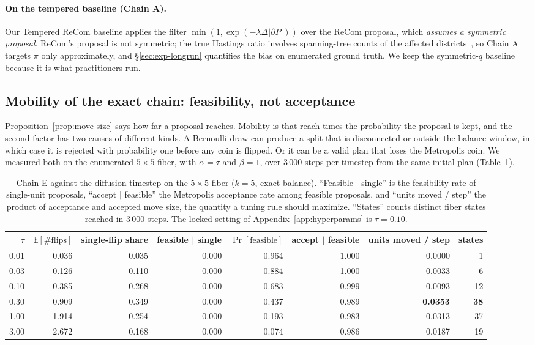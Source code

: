\documentclass[11pt]{article}
\newcommand{\E}{\mathbb{E}}
\begin{document}
\paragraph{On the tempered baseline (Chain A).} Our Tempered ReCom
baseline applies the filter $\min(1, \exp(-\lambda \Delta|\partial P|))$
over the ReCom proposal, which \emph{assumes a symmetric proposal}.
ReCom's proposal is not symmetric; the true Hastings ratio involves
spanning-tree counts of the affected
districts~\cite{autry2023metropolized,cannon2022spanning}, so Chain A
targets $\pi$ only approximately, and \S\ref{sec:exp-longrun}
quantifies the bias on enumerated ground truth. We keep the
symmetric-$q$ baseline because it is what practitioners run.

\subsection{Mobility of the exact chain: feasibility, not acceptance}\label{sec:mobility}

Proposition~\ref{prop:move-size} says how far a proposal reaches.
Mobility is that reach times the probability the proposal is kept,
and the second factor has two causes of different kinds. A Bernoulli
draw can produce a split that is disconnected or outside the balance
window, in which case it is rejected with probability one before any
coin is flipped. Or it can be a valid plan that loses the Metropolis
coin. We measured both on the enumerated $5 \times 5$ fiber, with
$\alpha = \tau$ and $\beta = 1$, over 3\,000 steps per timestep from
the same initial plan (Table~\ref{tab:mobility}).

\begin{table}[htbp]
\centering
\small
\begin{tabular}{rrrrrrrr}
\toprule
$\tau$ & $\E[\#\mathrm{flips}]$ & single-flip share & feasible $\mid$ single
  & $\Pr[\text{feasible}]$ & accept $\mid$ feasible & units moved / step & states \\
\midrule
0.01 & 0.036 & 0.035 & 0.000 & 0.964 & 1.000 & 0.0000 & 1 \\
0.03 & 0.126 & 0.110 & 0.000 & 0.884 & 1.000 & 0.0033 & 6 \\
0.10 & 0.385 & 0.268 & 0.000 & 0.683 & 0.999 & 0.0093 & 12 \\
0.30 & 0.909 & 0.349 & 0.000 & 0.437 & 0.989 & \textbf{0.0353} & \textbf{38} \\
1.00 & 1.914 & 0.254 & 0.000 & 0.193 & 0.983 & 0.0313 & 37 \\
3.00 & 2.672 & 0.168 & 0.000 & 0.074 & 0.986 & 0.0187 & 19 \\
\bottomrule
\end{tabular}
\caption{Chain E against the diffusion timestep on the $5 \times 5$
  fiber ($k = 5$, exact balance). ``Feasible $\mid$ single'' is the
  feasibility rate of single-unit proposals, ``accept $\mid$
  feasible'' the Metropolis acceptance rate among feasible
  proposals, and ``units moved / step'' the product of acceptance and
  accepted move size, the quantity a tuning rule should maximize.
  ``States'' counts distinct fiber states reached in 3\,000 steps.
  The locked setting of Appendix~\ref{app:hyperparams} is
  $\tau = 0.10$.}\label{tab:mobility}
\end{table}
\end{document}
